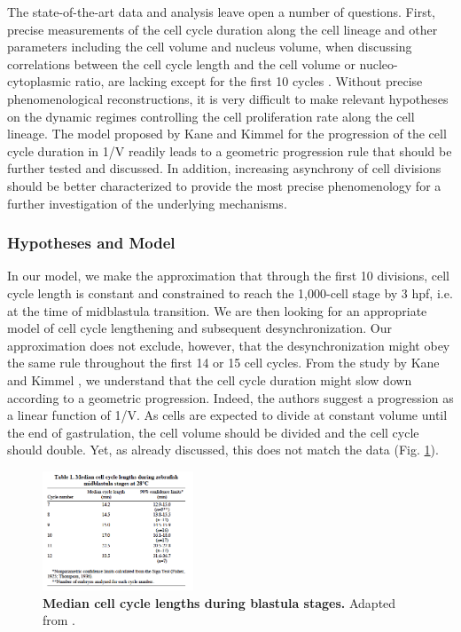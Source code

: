 The state-of-the-art data and analysis leave open a number of questions. First, precise measurements of the cell cycle duration along the cell lineage and other parameters including the cell volume and nucleus volume, when discussing correlations between the cell cycle length and the cell volume or nucleo-cytoplasmic ratio, are lacking except for the first 10 cycles \cite{Olivier:2010jz}. Without precise phenomenological reconstructions, it is very difficult to make relevant hypotheses on the dynamic regimes controlling the cell proliferation rate along the cell lineage. The model proposed by Kane and Kimmel for the progression of the cell cycle duration in 1/V readily leads to a geometric progression rule that should be further tested and discussed. In addition, increasing asynchrony of cell divisions should be better characterized to provide the most precise phenomenology for a further investigation of the underlying mechanisms.


\subsubsection{Hypotheses and Model}


In our model, we make the approximation that through the first 10 divisions, cell cycle length is constant and constrained to reach the 1,000-cell stage by 3 hpf, i.e. at the time of midblastula transition. We are then looking for an appropriate model of cell cycle lengthening and subsequent desynchronization. Our approximation does not exclude, however, that the desynchronization might obey the same rule throughout the first 14 or 15 cell cycles. From the study by Kane and Kimmel \cite{Kane:1993wp}, we understand that the cell cycle duration might slow down according to a geometric progression. Indeed, the authors suggest a progression as a linear function of 1/V. As cells are expected to divide at constant volume until the end of gastrulation, the cell volume should be divided and the cell cycle should double. Yet, as already discussed, this does not match the data (Fig. \ref{kane_kimmel_1993_cell_cycle_2}).
\begin{figure}
\begin{center}
\includegraphics[width=0.4\textwidth]{../../images/Cases_Studies/Case_1_Division/kane_kimmel_1993_cell_cycle_2.png}
\end{center}
\caption{\textbf{Median cell cycle lengths during blastula stages.} Adapted from \cite{Kane:1993wp}.}
\label{kane_kimmel_1993_cell_cycle_2}
\end{figure}

